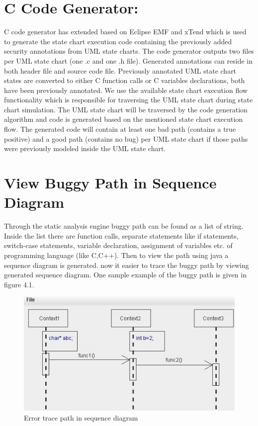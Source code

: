 \section{C Code Generator:}
C code generator has extended based on Eclipse EMF and xTend which is used to generate the state chart execution code containing the previously added security annotations from UML state charts. The code generator outputs two files per UML state chart (one .c and one
.h file). Generated annotations can reside in both header file
and source code file. Previously annotated UML state chart
states are converted to either C function calls or C variables
declarations, both have been previously annotated. We use
the available state chart execution flow functionality which is
responsible for traversing the UML state chart during state
chart simulation. The UML state chart will be traversed by the code generation algorithm and code is generated based on
the mentioned state chart execution flow. The generated code
will contain at least one bad path (contains a true positive) and
a good path (contains no bug) per UML state chart if those
paths were previously modeled inside the UML state chart.

\section{View Buggy Path in Sequence Diagram}
Through the static analysis engine buggy path can be found as a list of string. Inside the list there are function calls, separate statements like if statements, switch-case statements, variable declaration, assignment of variables etc. of programming language (like C,C++). Then to view the path using java a sequence diagram is generated.
now it easier to trace the buggy path by viewing generated sequence diagram. One sample example of the buggy path is given in figure 4.1.
\begin{figure}[htbp]
	\centering
	\includegraphics{styles/Error_trace_path.jpg}
	\caption{Error trace path in sequence diagram}
\end{figure}
